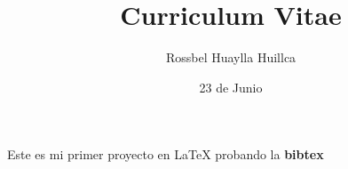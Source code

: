 \documentclass[12pt,letterpaper,landscape]{article}
\author{Rossbel Huaylla Huillca}
\title{Curriculum Vitae}
\date {23 de Junio}
\begin{document}
\maketitle 
Este es mi primer proyecto en \LaTeX
probando la \textbf{bibtex}
\end{document}
